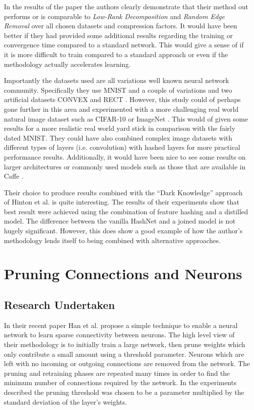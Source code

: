 \documentclass[journal]{IEEEtran}
\begin{document}
In the results of the paper the authors clearly demonstrate that their method out performs or is comparable to \textit{Low-Rank Decomposition} \cite{denil2013predicting} and \textit{Random Edge Removal} \cite{cirecsan2011high} over all chosen datasets and compression factors. It would have been better if they had provided some additional results regarding the training or convergence time compared to a standard network. This would give a sense of if it is more difficult to train compared to a standard approach or even if the methodology actually accelerates learning.

Importantly the datasets used are all variations well known neural network community. Specifically they use MNIST \cite{lecun1998gradient} and a couple of variations \cite{larochelle2007empirical} and two artificial datasets CONVEX and RECT \cite{larochelle2007empirical}. However, this study could of perhaps gone further in this area and experimented with a more challenging real world natural image dataset such as CIFAR-10 \cite{krizhevsky2009learning} or ImageNet \cite{deng2009imagenet}. This would of given some results for a more realistic real world yard stick in comparison with the fairly dated MNIST. They could have also combined complex image datasets with different types of layers (i.e. convolution) with hashed layers for more practical performance results. Additionally, it would have been nice to see some results on larger architectures or commonly used models such as those that are available in Caffe \cite{jia2014caffe}.

Their choice to produce results combined with the ``Dark Knowledge'' approach of Hinton et al. \cite{hinton2015distilling} is quite interesting. The results of their experiments show that best result were achieved using the combination of feature hashing and a distilled model. The difference between the vanilla HashNet and a joined model is not hugely significant. However, this does show a good example of how the author's methodology lends itself to being combined with alternative approaches.

\section{Pruning Connections and Neurons}
\label{sec:pruning}

\subsection{Research Undertaken}
In their recent paper Han et al. \cite{han2015learning} propose a simple technique to enable a neural network to learn sparse connectivity between neurons. The high level view of their methodology is to initially train a large network, then prune weights which only contribute a small amount using a threshold parameter. Neurons which are left with no incoming or outgoing connections are removed from the network. The pruning and retraining phases are repeated many times in order to find the minimum number of connections required by the network. In the experiments described the pruning threshold was chosen to be a parameter multiplied by the standard deviation of the layer's weights.
\end{document}
